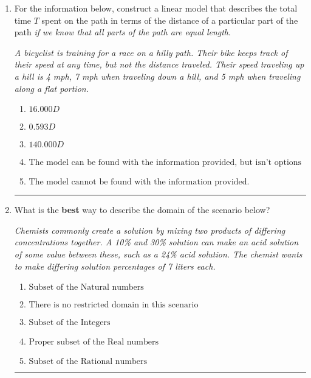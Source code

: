 \documentclass[14pt]{extbook}
\newcommand{\litem}[1]{\item#1\hspace*{-1cm}\rule{\textwidth}{0.4pt}}
\begin{document}
\begin{enumerate}
{\begin{enumerate}[label=\Alph*.]
\end{enumerate} }
\litem{
For the information below, construct a linear model that describes the total time $T$ spent on the path in terms of the distance of a particular part of the path \textit{if we know that all parts of the path are equal length}.
\begin{center}
    \textit{ A bicyclist is training for a race on a hilly path. Their bike keeps track of their speed at any time, but not the distance traveled. Their speed traveling up a hill is 4 mph, 7 mph when traveling down a hill, and 5 mph when traveling along a flat portion. }
\end{center}
\begin{enumerate}[label=\Alph*.]
\item \( 16.000 D \)
\item \( 0.593 D \)
\item \( 140.000 D \)
\item \( \text{The model can be found with the information provided, but isn't options 1-3.} \)
\item \( \text{The model cannot be found with the information provided.} \)

\end{enumerate} }
\litem{
What is the \textbf{best} way to describe the domain of the scenario below?
\begin{center}
    \textit{ Chemists commonly create a solution by mixing two products of differing concentrations together. A 10\% and 30\% solution can make an acid solution of some value between these, such as a 24\% acid solution. The chemist wants to make differing solution percentages of 7 liters each. }
\end{center}
\begin{enumerate}[label=\Alph*.]
\item \( \text{Subset of the Natural numbers} \)
\item \( \text{There is no restricted domain in this scenario} \)
\item \( \text{Subset of the Integers} \)
\item \( \text{Proper subset of the Real numbers} \)
\item \( \text{Subset of the Rational numbers} \)


\end{enumerate}}
\end{enumerate}
\end{document}

